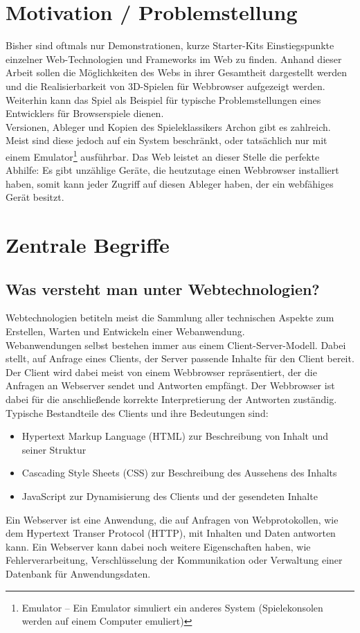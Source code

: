 \section{Motivation / Problemstellung}
\label{sec:motivation}
Bisher sind oftmals nur Demonstrationen, kurze Starter-Kits \bzw Einstiegspunkte einzelner Web-Technologien und Frameworks im Web zu finden. Anhand dieser Arbeit sollen die Möglichkeiten des Webs in ihrer Gesamtheit dargestellt werden und die Realisierbarkeit von 3D-Spielen für Webbrowser aufgezeigt werden. Weiterhin kann das Spiel als Beispiel für typische Problemstellungen eines Entwicklers für Browserspiele dienen.\\
Versionen, Ableger und Kopien des Spieleklassikers Archon gibt es zahlreich. Meist sind diese jedoch auf ein System beschränkt, oder tatsächlich nur mit einem Emulator\footnote{Emulator -- Ein Emulator simuliert ein anderes System (\zB Spielekonsolen werden auf einem Computer emuliert)} ausführbar. Das Web leistet an dieser Stelle die perfekte Abhilfe: Es gibt unzählige Geräte, die heutzutage einen Webbrowser installiert haben, somit kann jeder Zugriff auf diesen Ableger haben, der ein webfähiges Gerät besitzt.
\clearpage
\section{Zentrale Begriffe}
\label{sec:zentrale_begriffe}
\subsection{Was versteht man unter Webtechnologien?}
Webtechnologien betiteln meist die Sammlung aller technischen Aspekte zum Erstellen, Warten und Entwickeln einer Webanwendung.\\
Webanwendungen selbst bestehen immer aus einem Client-Server-Modell. Dabei stellt, auf Anfrage eines Clients, der Server passende Inhalte für den Client bereit. Der Client wird dabei meist von einem Webbrowser repräsentiert, der die Anfragen an Webserver sendet und Antworten empfängt. Der Webbrowser ist dabei für die anschließende korrekte Interpretierung der Antworten zuständig.
Typische Bestandteile des Clients und ihre Bedeutungen sind: 
\begin{itemize}
	\item Hypertext Markup Language (HTML) zur Beschreibung von Inhalt und seiner Struktur
	\item Cascading Style Sheets (CSS) zur Beschreibung des Aussehens des Inhalts
	\item JavaScript zur Dynamisierung des Clients und der gesendeten Inhalte
\end{itemize}
Ein Webserver ist eine Anwendung, die auf Anfragen von Webprotokollen, wie dem Hypertext Transer Protocol (HTTP), mit Inhalten und Daten antworten kann. Ein Webserver kann dabei noch weitere Eigenschaften haben, wie Fehlerverarbeitung, Verschlüsselung der Kommunikation oder Verwaltung einer Datenbank für Anwendungsdaten.
